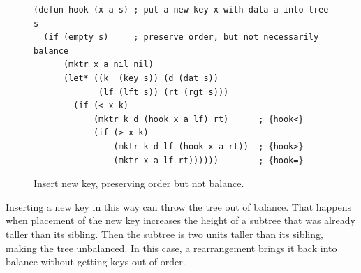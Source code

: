 \begin{figure}
\begin{center}
\begin{code}
\begin{verbatim}
(defun hook (x a s) ; put a new key x with data a into tree s
  (if (empty s)     ; preserve order, but not necessarily balance
      (mktr x a nil nil)
      (let* ((k  (key s)) (d (dat s))
             (lf (lft s)) (rt (rgt s)))
        (if (< x k)
            (mktr k d (hook x a lf) rt)      ; {hook<}
            (if (> x k)
                (mktr k d lf (hook x a rt))  ; {hook>}
                (mktr x a lf rt))))))        ; {hook=}
\end{verbatim}
\end{code}
\end{center}
\caption{Insert new key, preserving order but not balance.}
\label{fig:hook-defun}
\end{figure}

Inserting a new key in this way
can throw the tree out of balance.
That happens when
placement of the new key increases the height of a subtree that was
already taller than its sibling.
Then the subtree is two units taller than its sibling,
making the tree unbalanced.
In this case, a rearrangement brings it back into balance
without getting keys out of order.

